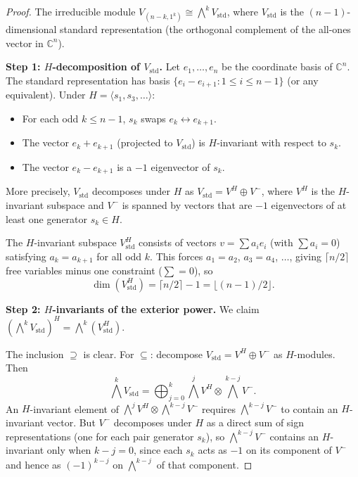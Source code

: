 \documentclass[11pt]{article}
\theoremstyle{definition}
\theoremstyle{remark}
\newcommand{\CC}{\mathbb{C}}
\begin{document}
\begin{proof}
The irreducible module $V_{(n-k,1^k)} \cong \bigwedge^k V_{\mathrm{std}}$,
where $V_{\mathrm{std}}$ is the $(n{-}1)$-dimensional standard
representation (the orthogonal complement of the all-ones vector in
$\CC^n$).

\textbf{Step 1: $H$-decomposition of $V_{\mathrm{std}}$.}
Let $e_1, \ldots, e_n$ be the coordinate basis of $\CC^n$. The standard
representation has basis $\{e_i - e_{i+1} : 1 \le i \le n-1\}$ (or
any equivalent). Under $H = \langle s_1, s_3, \ldots \rangle$:
\begin{itemize}
  \item For each odd $k \le n-1$, $s_k$ swaps $e_k \leftrightarrow e_{k+1}$.
  \item The vector $e_k + e_{k+1}$ (projected to $V_{\mathrm{std}}$) is
    $H$-invariant with respect to $s_k$.
  \item The vector $e_k - e_{k+1}$ is a $-1$ eigenvector of $s_k$.
\end{itemize}

More precisely, $V_{\mathrm{std}}$ decomposes under $H$ as
$V_{\mathrm{std}} = V^H \oplus V^{-}$, where $V^H$ is the
$H$-invariant subspace and $V^{-}$ is spanned by vectors that are
$-1$ eigenvectors of at least one generator $s_k \in H$.

The $H$-invariant subspace $V_{\mathrm{std}}^H$ consists of vectors
$v = \sum a_i e_i$ (with $\sum a_i = 0$) satisfying $a_k = a_{k+1}$
for all odd $k$. This forces $a_1 = a_2$, $a_3 = a_4$, $\ldots$,
giving $\lceil n/2\rceil$ free variables minus one constraint
($\sum = 0$), so
\[
  \dim(V_{\mathrm{std}}^H) = \lceil n/2 \rceil - 1
    = \lfloor(n-1)/2\rfloor.
\]

\textbf{Step 2: $H$-invariants of the exterior power.}
We claim $(\bigwedge^k V_{\mathrm{std}})^H = \bigwedge^k(V_{\mathrm{std}}^H)$.

The inclusion $\supseteq$ is clear. For $\subseteq$: decompose
$V_{\mathrm{std}} = V^H \oplus V^{-}$ as $H$-modules. Then
\[
  \bigwedge^k V_{\mathrm{std}} = \bigoplus_{j=0}^{k}
    \bigwedge^j V^H \otimes \bigwedge^{k-j} V^{-}.
\]
An $H$-invariant element of $\bigwedge^j V^H \otimes \bigwedge^{k-j} V^-$
requires $\bigwedge^{k-j} V^-$ to contain an $H$-invariant vector.
But $V^-$ decomposes under $H$ as a direct sum of sign representations
(one for each pair generator $s_k$), so $\bigwedge^{k-j} V^-$ contains
an $H$-invariant only when $k - j = 0$, since each $s_k$ acts as $-1$
on its component of $V^-$ and hence as $(-1)^{k-j}$ on
$\bigwedge^{k-j}$ of that component.


\end{proof}
\end{document}
